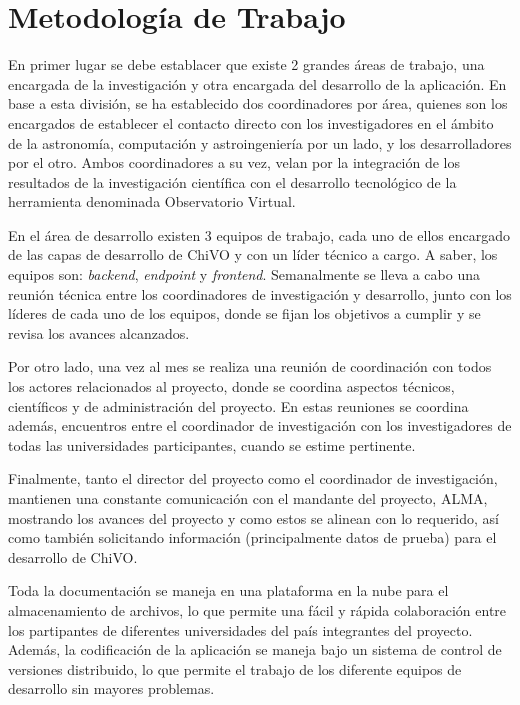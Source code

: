 \section{Metodología de Trabajo}

En primer lugar se debe establacer que existe 2 grandes áreas de
trabajo, una encargada de la investigación y otra encargada del
desarrollo de la aplicación. En base a esta división, se ha
establecido dos coordinadores por área, quienes son los encargados de
establecer el contacto directo con los investigadores en el ámbito de
la astronomía, computación y astroingeniería por un lado, y los
desarrolladores por el otro. Ambos coordinadores a su vez, velan por
la integración de los resultados de la investigación científica con el
desarrollo tecnológico de la herramienta denominada Observatorio Virtual.

En el área de desarrollo existen 3 equipos de trabajo, cada uno de
ellos encargado de las capas de desarrollo de ChiVO y con un líder
técnico a cargo. A saber, los equipos son: \emph{backend},
\emph{endpoint} y \emph{frontend}. Semanalmente se lleva a cabo una
reunión técnica entre los coordinadores de investigación y desarrollo,
junto con los líderes de cada uno de los equipos, donde se fijan los
objetivos a cumplir y se revisa los avances alcanzados.

Por otro lado, una vez al mes se realiza una reunión de coordinación
con todos los actores relacionados al proyecto, donde se coordina
aspectos técnicos, científicos y de administración del proyecto. En
estas reuniones se coordina además, encuentros entre el coordinador de
investigación con los investigadores de todas las universidades
participantes, cuando se estime pertinente.

Finalmente, tanto el director del proyecto como el coordinador de
investigación, mantienen una constante comunicación con el mandante
del proyecto, ALMA, mostrando los avances del proyecto y como estos se
alinean con lo requerido, así como también solicitando información
(principalmente datos de prueba) para el desarrollo de ChiVO.

Toda la documentación se maneja en una plataforma en la nube para el
almacenamiento de archivos, lo que permite una fácil y rápida
colaboración entre los partipantes de diferentes universidades del
país integrantes del proyecto. Además, la codificación de la
aplicación se maneja bajo un sistema de control de versiones
distribuido, lo que permite el trabajo de los diferente equipos de
desarrollo sin mayores problemas.

